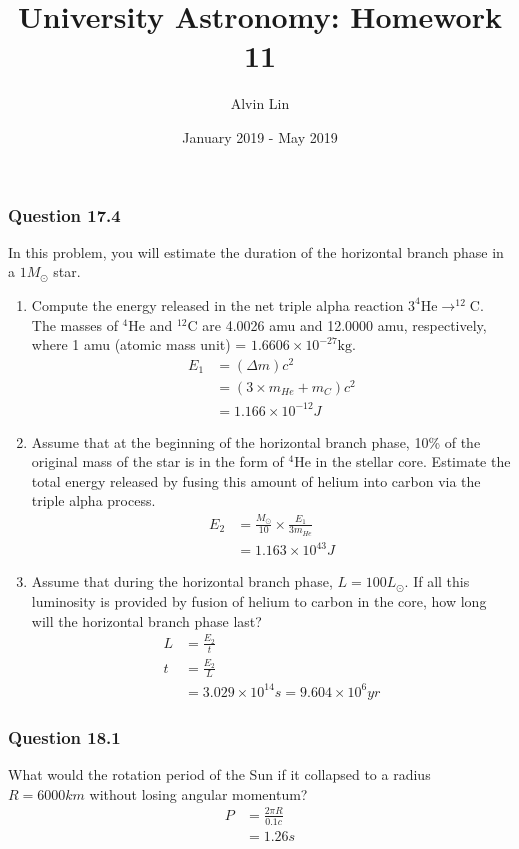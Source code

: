 \documentclass{math}
\title{University Astronomy: Homework 11}
\author{Alvin Lin}
\date{January 2019 - May 2019}
\begin{document}
\maketitle

\subsubsection*{Question 17.4}
In this problem, you will estimate the duration of the horizontal branch
phase in a \( 1M_{\odot} \) star.
\begin{enumerate}
  \item Compute the energy released in the net triple alpha reaction
    \( 3^4\text{He}\to ^{12}\text{C} \). The masses of \( ^4\text{He} \)
    and \( ^{12}\text{C} \) are 4.0026 amu and 12.0000 amu, respectively,
    where 1 amu (atomic mass unit) = \( 1.6606\times10^{-27}\text{kg} \).
  \begin{align*}
    E_1 &= (\Delta m)c^2 \\
    &= (3\times m_{He}+m_{C})c^2 \\
    &= 1.166\times10^{-12}J
  \end{align*}
  \item Assume that at the beginning of the horizontal branch phase,
    10\% of the original mass of the star is in the form of
    \( ^{4}\text{He} \) in the stellar core. Estimate the total energy
    released by fusing this amount of helium into carbon via the triple
    alpha process.
  \begin{align*}
    E_2 &= \frac{M_{\odot}}{10}\times\frac{E_1}{3m_{He}} \\
    &= 1.163\times10^{43}J
  \end{align*}
  \item Assume that during the horizontal branch phase,
    \( L = 100L_{\odot} \). If all this luminosity is provided by fusion of
    helium to carbon in the core, how long will the horizontal branch phase
    last?
  \begin{align*}
    L &= \frac{E_2}{t} \\
    t &= \frac{E_2}{L} \\
    &= 3.029\times10^{14}s = 9.604\times10^{6}yr
  \end{align*}
\end{enumerate}

\subsubsection*{Question 18.1}
What would the rotation period of the Sun if it collapsed to a radius
\( R = 6000km \) without losing angular momentum?
\begin{align*}
  P &= \frac{2\pi R}{0.1c} \\
  &= 1.26s
\end{align*}
\end{document}

